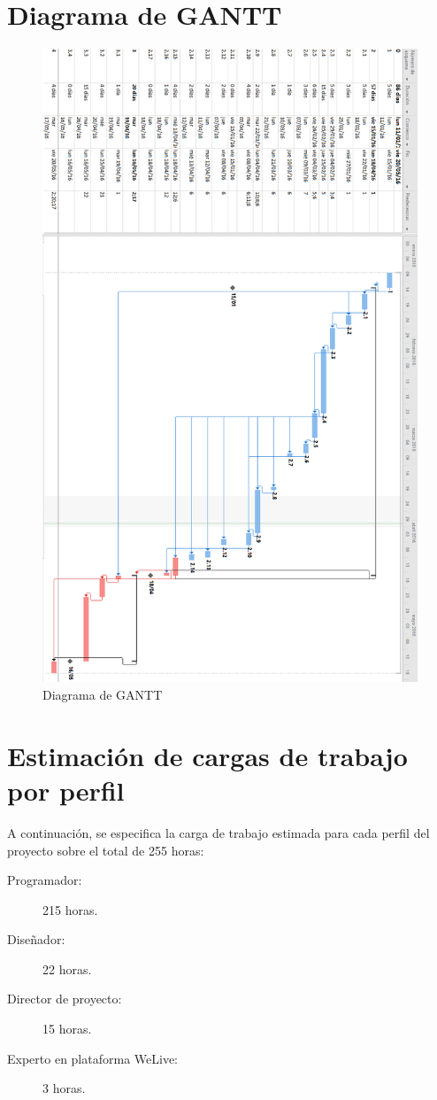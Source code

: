 \documentclass{DeustoFDP}
\begin{document}
\newpage
\section{Diagrama de GANTT}
\begin{figure}[H]
    \centering
    \includegraphics[width=340pt]{fig/gantt}
    \caption{Diagrama de GANTT}\label{fig:gantt}
\end{figure}

\section{Estimación de cargas de trabajo por perfil}
A continuación, se especifica la carga de trabajo estimada para cada perfil del proyecto sobre el total de 255 horas:
\begin{description}
   	\item[Programador:] 215 horas.
   	\item[Diseñador:] 22 horas.
   	\item[Director de proyecto:] 15 horas.
   	\item[Experto en plataforma WeLive:] 3 horas.
\end{description}   
\end{document}
